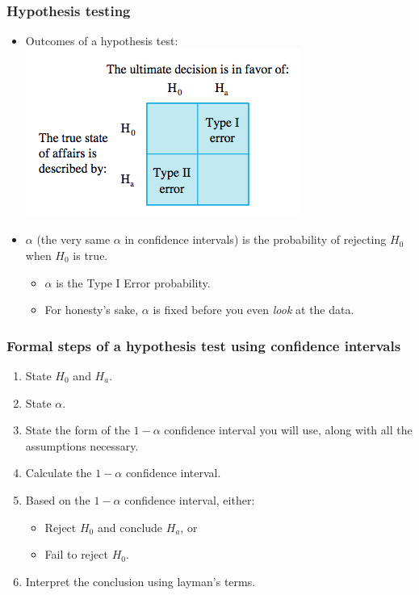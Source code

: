 \documentclass[handout]{beamer}\usepackage{graphicx, color}
\providecommand{\q}{$\quad$ \newline}
\numberwithin{equation}{section}
\begin{document}
\begin{frame}
\frametitle{Hypothesis testing}
\begin{itemize}
\item Outcomes of a hypothesis test: \q
{} \includegraphics{../../fig/typeerrors.png}
\pause \item $\alpha$ (the very same $\alpha$ in confidence intervals) is the probability of rejecting $H_0$ when $H_0$ is true.
\begin{itemize}
\pause \item $\alpha$ is the Type I Error probability.
\pause \item For honesty's sake, $\alpha$ is fixed before you even \emph{look} at the data.
\end{itemize} 
\end{itemize}
\end{frame}

\begin{frame}
\frametitle{Formal steps of a hypothesis test using confidence intervals}
\begin{enumerate}[1. ]
\item State $H_0$ and $H_a$.
\pause \item State $\alpha$.
\pause \item State the form of the $1 - \alpha$ confidence interval you will use, along with all the assumptions necessary.
\pause \item Calculate the $1 - \alpha$ confidence interval.
\pause \item Based on the $1 - \alpha$ confidence interval, either:
\begin{itemize}
\pause \item Reject $H_0$ and conclude $H_a$, or
\pause \item Fail to reject $H_0$.
\end{itemize}
\pause \item Interpret the conclusion using layman's terms.
\end{enumerate}
\end{frame}
\end{document}
